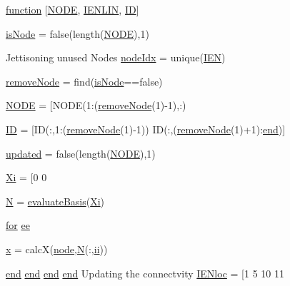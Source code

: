 \begin{DoxyCompactItemize}
\item 
\hyperlink{a00605_a0de0569134ddb1d040c23e040474da9a}{function} \mbox{[}\hyperlink{a00605_a28010846a3742b3c2c07f00b1f1536ff}{N\+O\+DE}, \hyperlink{a00605_a924f6afb8fc3a0c028349f92c93d4f22}{I\+E\+N\+L\+IN}, \hyperlink{a00605_a094c367727273b4da2b960ca3b3edc06}{ID}\mbox{]}
\item 
\hyperlink{a00605_a74556944edc5b1cde67a5d60a6aaf7b3}{is\+Node} = false(length(\hyperlink{a00605_a28010846a3742b3c2c07f00b1f1536ff}{N\+O\+DE}),1)
\item 
Jettisoning unused Nodes \hyperlink{a00605_a3891165b790964e5812b60f12517cbe9}{node\+Idx} = unique(\hyperlink{a00608_ada37e689768b959686f183a3d534464b}{I\+EN})
\item 
\hyperlink{a00605_ae344a0a545940b078e36623bf4b44c7f}{remove\+Node} = find(\hyperlink{a00605_afc9289da26bc38f7028f9de5824c2c72}{is\+Node}==false)
\item 
\hyperlink{a00605_a1ad005a5fea6e31be66b1791cb8dbf4d}{N\+O\+DE} = \mbox{[}N\+O\+DE(1\+:(\hyperlink{a00605_ae344a0a545940b078e36623bf4b44c7f}{remove\+Node}(1)-\/1),\+:)
\item 
\hyperlink{a00605_a094c367727273b4da2b960ca3b3edc06}{ID} = \mbox{[}ID(\+:,1\+:(\hyperlink{a00605_ae344a0a545940b078e36623bf4b44c7f}{remove\+Node}(1)-\/1)) ID(\+:,(\hyperlink{a00605_ae344a0a545940b078e36623bf4b44c7f}{remove\+Node}(1)+1)\+:\hyperlink{a00608_afb358f48b1646c750fb9da6c6585be2b}{end})\mbox{]}
\item 
\hyperlink{a00605_ae27e566dc7dcd1f77211f8374e4b017a}{updated} = false(length(\hyperlink{a00605_a28010846a3742b3c2c07f00b1f1536ff}{N\+O\+DE}),1)
\item 
\hyperlink{a00605_a34d6ec2e729af94d4261c2243a358e05}{Xi} = \mbox{[}0 0
\item 
\hyperlink{a00605_a8cc2e7240164328fdc3f0e5e21032c56}{N} = \hyperlink{a00599_a2aba2292a481f3bb8f85213baf22686b}{evaluate\+Basis}(\hyperlink{a00605_a34d6ec2e729af94d4261c2243a358e05}{Xi})
\item 
\hyperlink{a00623_ad1e7380d51df1e0043d24d3c8a860e0a}{for} \hyperlink{a00605_af3a3092fbb5f170a7baecf75fd1b29d2}{ee}
\item 
\hyperlink{a00605_ac98c3bb25378222646e977292011625f}{x} = calcX(\hyperlink{a00611_adf51fe9945b6ca147057cc27ff639d0f}{node},\hyperlink{a00473_a5b9c4563028063ee53b517cce9aa701b}{N}(\+:,\hyperlink{a00605_abf9d47cd7d4fbc942e618bb1977019c2}{ii}))
\item 
\hyperlink{a00608_afb358f48b1646c750fb9da6c6585be2b}{end} \hyperlink{a00608_afb358f48b1646c750fb9da6c6585be2b}{end} \hyperlink{a00608_afb358f48b1646c750fb9da6c6585be2b}{end} \hyperlink{a00608_afb358f48b1646c750fb9da6c6585be2b}{end} Updating the connectvity \hyperlink{a00605_ae3396d631c6896e8f9cb538bbd562cd6}{I\+E\+Nloc} = \mbox{[}1 5 10 11

\end{DoxyCompactItemize}
